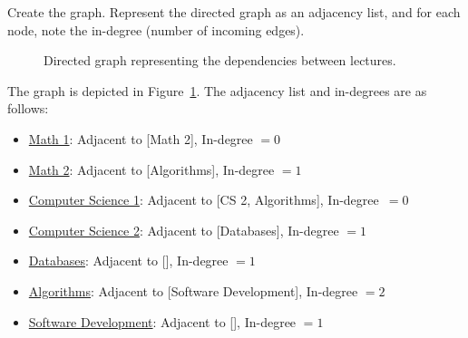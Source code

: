 \begin{ejercicio}
    Create the graph. Represent the directed graph as an adjacency list, and for each node, note the in-degree (number of incoming edges).
    \begin{figure}
        \caption{Directed graph representing the dependencies between lectures.}
        \label{fig:graphExcercise2}
    \end{figure}

    The graph is depicted in Figure~\ref{fig:graphExcercise2}. The adjacency list and in-degrees are as follows:
\begin{itemize}
    \item \ul{Math 1}: Adjacent to [Math 2], In-degree $= 0$
    \item \ul{Math 2}: Adjacent to [Algorithms], In-degree $= 1$
    \item \ul{Computer Science 1}: Adjacent to [CS 2, Algorithms], In-degree~$= 0$
    \item \ul{Computer Science 2}: Adjacent to [Databases], In-degree $= 1$
    \item \ul{Databases}: Adjacent to [], In-degree $= 1$
    \item \ul{Algorithms}: Adjacent to [Software Development], In-degree $= 2$
    \item \ul{Software Development}: Adjacent to [], In-degree $= 1$
\end{itemize}
\end{ejercicio}

